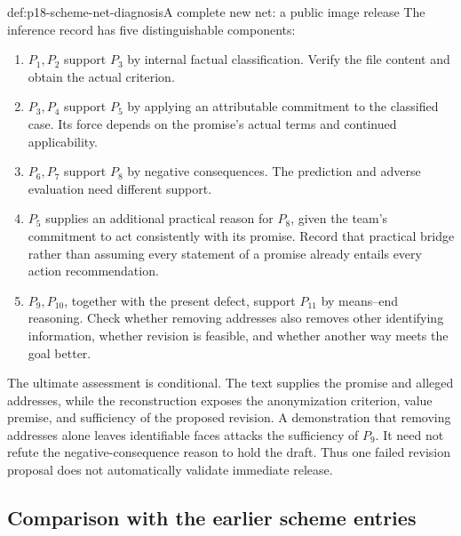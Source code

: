 \begin{hbexample}{def:p18-scheme-net-diagnosis}{A complete new net: a public image release}
The inference record has five distinguishable components:
\begin{enumerate}
\item \(P_1,P_2\) support \(P_3\) by internal factual classification.
Verify the file content and obtain the actual criterion.
\item \(P_3,P_4\) support \(P_5\) by applying an attributable
commitment to the classified case. Its force depends on the promise's
actual terms and continued applicability.
\item \(P_6,P_7\) support \(P_8\) by negative consequences.
The prediction and adverse evaluation need different support.
\item \(P_5\) supplies an additional practical reason for \(P_8\),
given the team's commitment to act consistently with its promise.
Record that practical bridge rather than assuming every statement
of a promise already entails every action recommendation.
\item \(P_9,P_{10}\), together with the present defect, support
\(P_{11}\) by means--end reasoning. Check whether removing addresses
also removes other identifying information, whether revision is
feasible, and whether another way meets the goal better.
\end{enumerate}

The ultimate assessment is conditional. The text supplies the
promise and alleged addresses, while the reconstruction exposes
the anonymization criterion, value premise, and sufficiency of the
proposed revision. A demonstration that removing addresses alone
leaves identifiable faces attacks the sufficiency of \(P_9\).
It need not refute the negative-consequence reason to hold the draft.
Thus one failed revision proposal does not automatically validate
immediate release.
\end{hbexample}

\subsection{Comparison with the earlier scheme entries}

